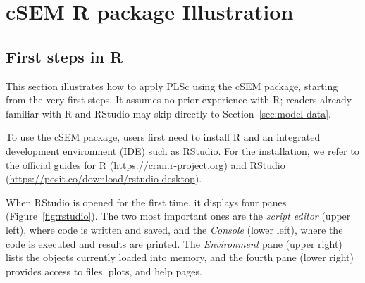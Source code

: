 \documentclass[12pt,a4paper]{article}\usepackage[]{graphicx}\usepackage[]{xcolor}
\newcommand{\pkg}[1]{\textsf{#1}}
\newcommand{\op}[1]{\texttt{#1}}   %
\begin{document}



\section{cSEM R package Illustration}
\subsection{First steps in \textsf{R}}
This section illustrates how to apply PLSc using the \pkg{cSEM} package, starting from the very first steps.
It assumes no prior experience with \textsf{R};
readers already familiar with \textsf{R} and \textsf{RStudio} may skip directly to Section~\ref{sec:model-data}.

To use the \pkg{cSEM} package, users first need to install \textsf{R} and an integrated development environment (IDE) such as \textsf{RStudio}.
For the installation, we refer to the official guides for \textsf{R} (\url{https://cran.r-project.org}) and \textsf{RStudio} (\url{https://posit.co/download/rstudio-desktop}).

When \textsf{RStudio} is opened for the first time, it displays four panes (Figure~\ref{fig:rstudio}).
The two most important ones are the \emph{script editor} (upper left), where code is written and saved, and the \emph{Console} (lower left), where the code is executed and results are printed.
The \emph{Environment} pane (upper right) lists the objects currently loaded into memory, and the fourth pane (lower right) provides access to files, plots, and help pages.
\end{document}
